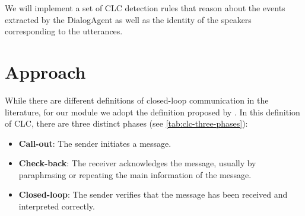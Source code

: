 We will implement a set of CLC detection rules that reason about the events
extracted by the DialogAgent as well as the identity of the speakers
corresponding to the utterances.


\section{Approach}

While there are different definitions of closed-loop communication in the
literature, for our module we adopt the definition proposed by
\citet{Hargestam.ea:2013}.  In this definition of CLC, there are three distinct
phases (see \autoref{tab:clc-three-phases}): 

\begin{itemize}

    \item \textbf{Call-out}: The sender initiates a message.

    \item \textbf{Check-back}: The receiver acknowledges the message, usually
        by paraphrasing or repeating the main information of the message.

    \item \textbf{Closed-loop}: The sender verifies that the message has been
                received and interpreted correctly.

\end{itemize}

\newcommand{\utteranceone}{\textit{This is Green. I’m finishing this side, blue, could you check the central for victims? }} 
\newcommand{\utterancetwo}{\textit{This is Blue. Okay. I’ll go check the central for victims.}}
\newcommand{\utterancethree}{\textit{All right, thank you, Blue.}}

